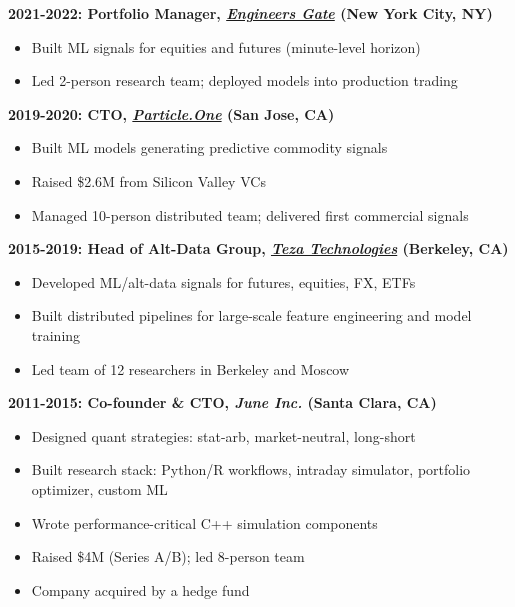 \documentclass[10pt, letterpaper]{article}
\providecommand{\tightlist}{%
\setlength{\itemsep}{0pt}
\setlength{\parskip}{0pt}}
\begin{document}
  \textbf{2021-2022: Portfolio Manager,
  \href{https://www.eglp.com/}{\emph{Engineers Gate}} (New York City, NY)}

  \begin{itemize}
    \tightlist

    \item Built ML signals for equities and futures (minute-level
      horizon)

    \item Led 2-person research team; deployed models into production
      trading
  \end{itemize}

  \textbf{2019-2020: CTO,
  \href{https://www.particle.one/}{\emph{Particle.One}} (San Jose, CA)}

  \begin{itemize}
    \tightlist

    \item Built ML models generating predictive commodity signals

    \item Raised \$2.6M from Silicon Valley VCs

    \item Managed 10-person distributed team; delivered first commercial
      signals
  \end{itemize}

  \textbf{2015-2019: Head of Alt-Data Group,
  \href{https://www.teza.com/}{\emph{Teza Technologies}} (Berkeley, CA)}

  \begin{itemize}
    \tightlist

    \item Developed ML/alt-data signals for futures, equities, FX, ETFs

    \item Built distributed pipelines for large-scale feature engineering
      and model training

    \item Led team of 12 researchers in Berkeley and Moscow
  \end{itemize}

  \textbf{2011-2015: Co-founder \& CTO, \emph{June Inc.} (Santa Clara, CA)}

  \begin{itemize}
    \tightlist

    \item Designed quant strategies: stat-arb, market-neutral, long-short

    \item Built research stack: Python/R workflows, intraday simulator,
      portfolio optimizer, custom ML

    \item Wrote performance-critical C++ simulation components

    \item Raised \$4M (Series A/B); led 8-person team

    \item Company acquired by a hedge fund
  \end{itemize}
\end{document}
